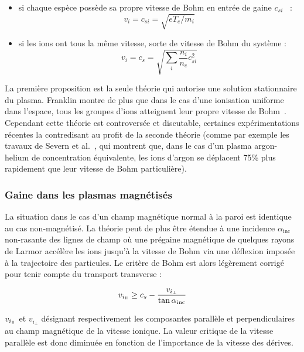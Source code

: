 \begin{refsection}
\begin{itemize}
  \item si chaque espèce possède sa
propre vitesse de Bohm en entrée de gaine $c_{si}$~\parencite{Allen} :
\begin{equation}
\label{1-BohmSpeed1}
v_i=c_{si}=\sqrt{eT_e/m_i}
\end{equation}
	\item si les ions ont tous la même vitesse, sorte de vitesse de Bohm du système
	:
	\begin{equation}
\label{1-BohmSpeed2}
v_i=c_s=\sqrt{\sum_i\frac{n_i}{n_e}c_{si}^2}
\end{equation}
 \end{itemize}

La première proposition est la seule théorie
qui autorise une solution stationnaire du plasma. Franklin
montre de plus que dans le cas d'une ionisation uniforme dans l'espace, tous les groupes
d'ions atteignent leur propre vitesse de Bohm~\parencite{Franklin}. Cependant
cette théorie est controversée et discutable, certaines expérimentations
récentes la contredisant au profit de la seconde théorie (comme par exemple les travaux de
Severn et al.~\parencite{Severn}, qui montrent que, dans le cas d'un plasma
argon-helium de concentration équivalente, les ions d'argon se déplacent 75\%
plus rapidement que leur vitesse de Bohm particulière).

\subsubsection{Gaine dans les plasmas magnétisés}
La situation dans le cas d'un champ magnétique normal à la paroi est
identique au cas non-magnétisé. La théorie peut de plus être étendue 
à une incidence $\alpha_\text{inc}$ non-rasante des lignes de champ où une
prégaine magnétique de quelques rayons de Larmor accélère les ions jusqu'à la
vitesse de Bohm via une déflexion imposée à la trajectoire des particules. Le
critère de Bohm est alors légèrement corrigé pour tenir compte du transport transverse
\cite{Stangeby} :

\begin{equation}
	v_{i_{\para}}\geq
	c_{s}-\frac{v_{i_{\perp}}}{\tan{\alpha_\text{inc}}}
\end{equation}
 
 $v_{i_{\para}}$ et $v_{i_{\perp}}$ désignant respectivement les composantes
 parallèle et perpendiculaires au champ magnétique de la vitesse ionique. La valeur critique
 de la vitesse parallèle est donc diminuée en fonction de l'importance de la
 vitesse des dérives.
 

\end{refsection}
